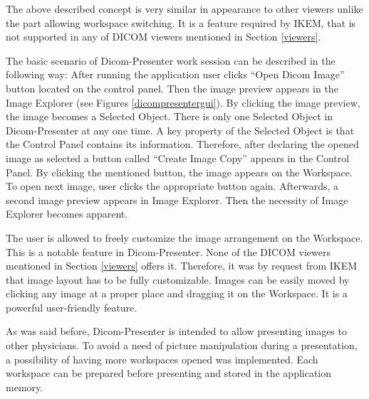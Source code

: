 The above described concept is very similar in appearance to other viewers unlike the part allowing workspace switching. It is a feature required by IKEM, that is not supported in any of DICOM viewers mentioned in Section \ref{viewers}.

The basic scenario of Dicom-Presenter work session can be described in the following way: After running the application user clicks ``Open Dicom Image'' button located on the control panel. Then the image preview appears in the Image Explorer (see Figures \ref{dicompresentergui}). By clicking the image preview, the image becomes a Selected Object. There is only one Selected Object in Dicom-Presenter at any one time. A key property of the Selected Object is that the Control Panel contains its information. Therefore, after declaring the opened image as selected a button called ``Create Image Copy'' appears in the Control Panel. By clicking the mentioned button, the image appears on the Workspace. To open next image, user clicks the appropriate button again. Afterwards, a second image preview appears in Image Explorer. Then the necessity of Image Explorer becomes apparent.

The user is allowed to freely customize the image arrangement on the Workspace. This is a notable feature in Dicom-Presenter. None of the DICOM viewers mentioned in Section \ref{viewers} offers it. Therefore, it was by request from IKEM that image layout has to be fully customizable. Images can be easily moved  by clicking any image at a proper place and dragging it on the Workspace.  It is a powerful user-friendly feature.

As was said before, Dicom-Presenter is intended to allow presenting images to other physicians. To avoid a need of picture manipulation during a presentation, a possibility of having more workspaces opened was implemented. Each workspace can be prepared before presenting and stored in the application memory.
 
